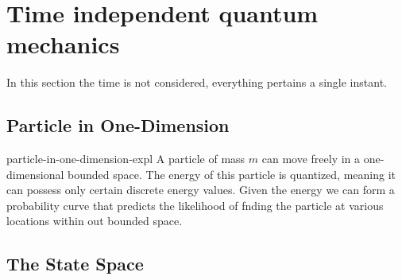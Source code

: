 \documentclass[preview]{standalone}
\begin{document}
\genpage

\section{Time independent quantum mechanics}

\begin{plainhtml}
    In this section the time is not considered, everything pertains a single instant.
\end{plainhtml}

\subsection{Particle in One-Dimension}

\begin{snippet}{particle-in-one-dimension-expl}
    A particle of mass \(m\) can move freely in a one-dimensional bounded space.
    The energy of this particle is quantized, meaning it can possess only certain discrete energy values.
    Given the energy we can form a probability curve that predicts the likelihood of fnding the particle at various locations within out bounded space.
\end{snippet}

\subsection{The State Space}
\end{document}
